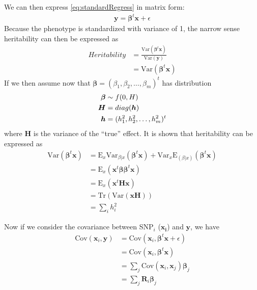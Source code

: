 			We can then express \cref{eq:standardRegress} in matrix form:
			\begin{align}
				\boldsymbol{y}=\boldsymbol{\beta}^t\boldsymbol{x}+\epsilon
				\label{eq:matrixRegress}
			\end{align}
			Because the phenotype is standardized with variance of 1, the narrow sense heritability can then be expressed as
			\begin{align}
				Heritability& = \frac{\mathrm{Var}(\boldsymbol{\beta}^t\boldsymbol{x})}{\mathrm{Var}(\boldsymbol{y})} \nonumber\\
				&=\mathrm{Var}(\boldsymbol{\beta}^t\boldsymbol{x})
			\end{align}
			If we then assume now that $\boldsymbol{\beta} = (\beta_1, \beta_2,\dots,\beta_m)^t$ has distribution
			\begin{align*}
				\boldsymbol{\beta}&\sim f(0,\boldmath{H})\\
				\boldsymbol{H}&=diag(\boldsymbol{h})\\
				\boldsymbol{h}&=(h_1^2,h_2^2,\dots,h_m^2)^t
			\end{align*}
			where $\boldsymbol{H}$ is the variance of the ``true'' effect. 
			It is shown that heritability can be expressed as %
			\begin{align}
			\mathrm{Var}(\boldsymbol{\beta}^t\boldsymbol{x}) &= \mathrm{E}_x\mathrm{Var}_{\beta|x}(\boldsymbol{\beta}^t\boldsymbol{x})+\mathrm{Var}_x\mathrm{E}_{(\beta|x)}(\boldsymbol{\beta}^t\boldsymbol{x}) \nonumber\\
			&=\mathrm{E}_x(\boldsymbol{x}^t\boldsymbol{\beta\beta}^t\boldsymbol{x}) \nonumber\\ 
			&= \mathrm{E}_x(\boldsymbol{x}^t\boldsymbol{Hx}) \nonumber\\
			&=\mathrm{Tr}(\mathrm{Var}(\boldsymbol{x}\boldsymbol{H})) \nonumber\\
			&=\sum_ih_i^2
			\label{eq:proveHerit}
			\end{align}
			
			Now if we consider the covariance between \gls{SNP}$_i$ ($\boldsymbol{x_i}$) and $\boldsymbol{y}$, we have
			\begin{align}
			 \mathrm{Cov}(\boldsymbol{x}_i,\boldsymbol{y}) &= \mathrm{Cov}(\boldsymbol{x}_i,\boldsymbol{\beta}^t\boldsymbol{x}+\epsilon) \nonumber\\
			 &=\mathrm{Cov}(\boldsymbol{x}_i,\boldsymbol{\beta}^t\boldsymbol{x}) \nonumber\\
			 &=\sum_j{\mathrm{Cov}(\boldsymbol{x}_i,\boldsymbol{x}_j)\boldsymbol{\beta}_j} \nonumber\\
			 &=\sum_j{\boldsymbol{R}_i\boldsymbol{\beta}_j}
			 \label{eq:covPhenoTrue}
			\end{align}
			

